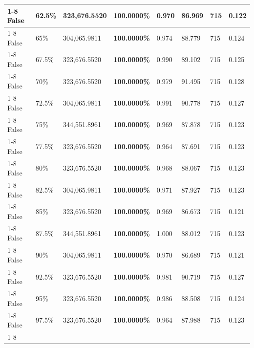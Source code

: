 \begin{table}[H]
\begin{tabular}{lllrllll}
\cline{1-8} \cline{2-8}
False & 62.5\% & 323,676.5520 & \bfseries \color{red} 100.0000\% & 0.970 & 86.969 & 715 & 0.122 \\
\cline{1-8} \cline{2-8}
False & 65\% & \color{red} 304,065.9811 & \bfseries \color{red} 100.0000\% & 0.974 & 88.779 & 715 & 0.124 \\
\cline{1-8} \cline{2-8}
False & 67.5\% & 323,676.5520 & \bfseries \color{red} 100.0000\% & 0.990 & 89.102 & 715 & 0.125 \\
\cline{1-8} \cline{2-8}
False & 70\% & 323,676.5520 & \bfseries \color{red} 100.0000\% & 0.979 & 91.495 & 715 & 0.128 \\
\cline{1-8} \cline{2-8}
False & 72.5\% & \color{red} 304,065.9811 & \bfseries \color{red} 100.0000\% & 0.991 & 90.778 & 715 & 0.127 \\
\cline{1-8} \cline{2-8}
False & 75\% & 344,551.8961 & \bfseries \color{red} 100.0000\% & 0.969 & 87.878 & 715 & 0.123 \\
\cline{1-8} \cline{2-8}
False & 77.5\% & 323,676.5520 & \bfseries \color{red} 100.0000\% & 0.964 & 87.691 & 715 & 0.123 \\
\cline{1-8} \cline{2-8}
False & 80\% & 323,676.5520 & \bfseries \color{red} 100.0000\% & 0.968 & 88.067 & 715 & 0.123 \\
\cline{1-8} \cline{2-8}
False & 82.5\% & \color{red} 304,065.9811 & \bfseries \color{red} 100.0000\% & 0.971 & 87.927 & 715 & 0.123 \\
\cline{1-8} \cline{2-8}
False & 85\% & 323,676.5520 & \bfseries \color{red} 100.0000\% & 0.969 & 86.673 & 715 & 0.121 \\
\cline{1-8} \cline{2-8}
False & 87.5\% & 344,551.8961 & \bfseries \color{red} 100.0000\% & 1.000 & 88.012 & 715 & 0.123 \\
\cline{1-8} \cline{2-8}
False & 90\% & \color{red} 304,065.9811 & \bfseries \color{red} 100.0000\% & 0.970 & 86.689 & 715 & 0.121 \\
\cline{1-8} \cline{2-8}
False & 92.5\% & 323,676.5520 & \bfseries \color{red} 100.0000\% & 0.981 & 90.719 & 715 & 0.127 \\
\cline{1-8} \cline{2-8}
False & 95\% & 323,676.5520 & \bfseries \color{red} 100.0000\% & 0.986 & 88.508 & 715 & 0.124 \\
\cline{1-8} \cline{2-8}
False & 97.5\% & 323,676.5520 & \bfseries \color{red} 100.0000\% & 0.964 & 87.988 & 715 & 0.123 \\
\cline{1-8} \cline{2-8}
\bottomrule
\end{tabular}
\end{table}
